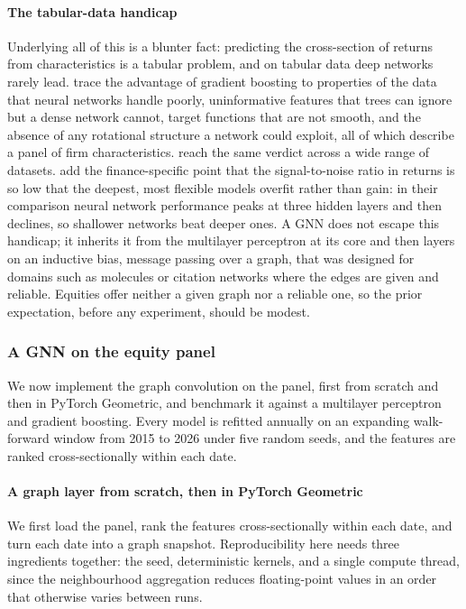 \paragraph{The tabular-data handicap}\label{sec_gnn_tabular}

Underlying all of this is a blunter fact: predicting the cross-section of returns from characteristics is a tabular problem, and on tabular data deep networks rarely lead. \cite{grinsztajn2022treebased} trace the advantage of gradient boosting to properties of the data that neural networks handle poorly, uninformative features that trees can ignore but a dense network cannot, target functions that are not smooth, and the absence of any rotational structure a network could exploit, all of which describe a panel of firm characteristics. \cite{shwartzziv2022tabular} reach the same verdict across a wide range of datasets. \cite{gu2020empirical} add the finance-specific point that the signal-to-noise ratio in returns is so low that the deepest, most flexible models overfit rather than gain: in their comparison neural network performance peaks at three hidden layers and then declines, so shallower networks beat deeper ones. A GNN does not escape this handicap; it inherits it from the multilayer perceptron at its core and then layers on an inductive bias, message passing over a graph, that was designed for domains such as molecules or citation networks where the edges are given and reliable. Equities offer neither a given graph nor a reliable one, so the prior expectation, before any experiment, should be modest.

\subsubsection{A GNN on the equity panel}\label{sec_gnn_panel}

We now implement the graph convolution on the panel, first from scratch and then in PyTorch Geometric, and benchmark it against a multilayer perceptron and gradient boosting. Every model is refitted annually on an expanding walk-forward window from 2015 to 2026 under five random seeds, and the features are ranked cross-sectionally within each date.

\paragraph{A graph layer from scratch, then in PyTorch Geometric}\label{sec_gnn_scratch}

We first load the panel, rank the features cross-sectionally within each date, and turn each date into a graph snapshot. Reproducibility here needs three ingredients together: the seed, deterministic kernels, and a single compute thread, since the neighbourhood aggregation reduces floating-point values in an order that otherwise varies between runs.

